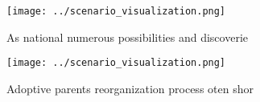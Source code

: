 \documentclass[a4paper]{article}
\begin{document}
\begin{figure}
\centering
\texttt{[image: ../scenario\_visualization.png]}
\caption{As national numerous possibilities and discoverie
}
\end{figure}
 
\begin{figure}
\centering
\texttt{[image: ../scenario\_visualization.png]}
\caption{Adoptive parents reorganization process oten shor
}
\end{figure}
 
\end{document}
